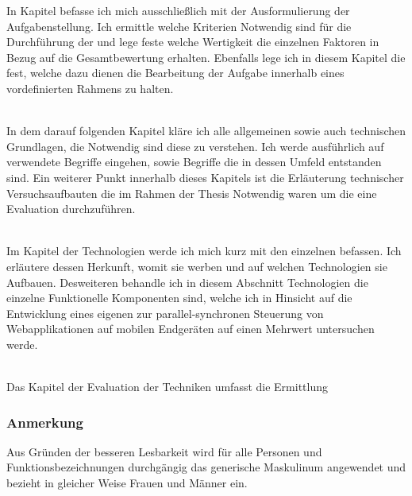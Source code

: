 \pagebreak
In Kapitel  befasse ich mich ausschließlich mit der Ausformulierung der Aufgabenstellung. Ich ermittle welche Kriterien Notwendig sind für die Durchführung der  und lege feste welche Wertigkeit die einzelnen Faktoren in Bezug auf die Gesamtbewertung erhalten. Ebenfalls lege ich in diesem Kapitel die  fest, welche dazu dienen die Bearbeitung der Aufgabe innerhalb eines vordefinierten Rahmens zu halten.

\\
In dem darauf folgenden Kapitel kläre ich alle allgemeinen sowie auch technischen Grundlagen, die Notwendig sind diese  zu verstehen. Ich werde ausführlich auf verwendete Begriffe eingehen, sowie Begriffe die in dessen Umfeld entstanden sind. Ein weiterer Punkt innerhalb dieses Kapitels ist die Erläuterung technischer Versuchsaufbauten die im Rahmen der Thesis Notwendig waren um die eine Evaluation durchzuführen.

\\
Im Kapitel der Technologien werde ich mich kurz mit den einzelnen  befassen. Ich erläutere dessen Herkunft, womit sie werben und auf welchen Technologien sie Aufbauen. Desweiteren behandle ich in diesem Abschnitt Technologien die einzelne Funktionelle Komponenten sind, welche ich in Hinsicht auf die Entwicklung eines eigenen  zur parallel-synchronen Steuerung von Webapplikationen auf mobilen Endgeräten auf einen Mehrwert untersuchen werde.

\\
Das Kapitel der Evaluation der Techniken umfasst die Ermittlung 


\subsubsection{Anmerkung}
Aus Gründen der besseren Lesbarkeit wird für alle Personen und Funktionsbezeichnungen durchgängig das generische Maskulinum angewendet und bezieht in gleicher Weise Frauen und Männer ein.